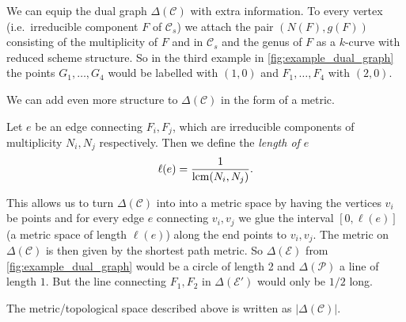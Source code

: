 We can equip the dual graph $\Delta(\mathscr C) $ with extra information. 
To every vertex (i.e.\ irreducible component  $F$ of $\mathscr C_s$) we attach the pair $(N(F), g(F))$ consisting of the multiplicity of $F$ and in $\mathscr C_s$ and the genus of $F$ as a $k$-curve with reduced scheme structure. 
So in the third example in \cref{fig:example_dual_graph} the points $G_1, \ldots, G_4$ would be labelled with $(1, 0)$ and $F_1, \ldots, F_4$ with $(2, 0)$. 

We can add even more structure to $\Delta(\mathscr C)$ in the form of a metric. 
\begin{definition}
Let $e$ be an edge connecting $F_i, F_j$, which are irreducible components of multiplicity $N_i, N_j$ respectively. 
Then we define the \emph{length of $e$ }  \[
	\ell(e) = \frac{1}{\operatorname{lcm} (N_i, N_j)}
.\] 
\end{definition}

This allows us to turn $\Delta(\mathscr C)$ into into a metric space by having the vertices $v_i$ be points and for every edge  $e$ connecting $v_i, v_j$ we glue the interval $[0, \ell(e)]$ (a metric space of length $\ell(e)$) along the end points to $v_i, v_j$. 
The metric on $\Delta(\mathscr C)$ is then given by the shortest path metric. 
So $\Delta(\mathscr E )$ from \cref{fig:example_dual_graph} would be a circle of length 2 and $\Delta (\mathscr P)$ a line of length $1$. 
But the line connecting $F_1, F_2$ in $\Delta(\mathscr E')$ would only be $1 /2$ long. 
\begin{definition}
	The metric/topological space described above is written as $|\Delta(\mathscr C)|$. 
\end{definition}

